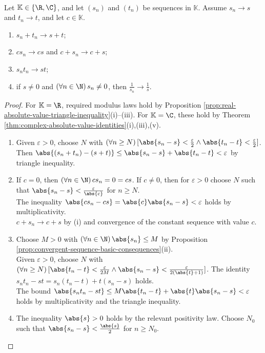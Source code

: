 \begin{theorem} \label{thm:complex-sequence-limit-algebra} \\
Let $\mathbb{K}\in\{\R,\C\}$, and let $(s_n)$ and $(t_n)$ be sequences in $\mathbb{K}$. Assume $s_n\to s$ and $t_n\to t$, and let $c\in\mathbb{K}$.
\begin{enumerate}[label=(\roman*)]
\setlength{\itemsep}{0pt}
\item $s_n+t_n\to s+t$;
\item $cs_n\to cs$ and $c+s_n\to c+s$;
\item $s_nt_n\to st$;
\item if $s\neq0$ and $(\forall n\in\N)\,s_n\neq0$, then $\frac{1}{s_n}\to\frac{1}{s}$.
\end{enumerate}
\begin{proof}
For $\mathbb{K}=\R$, required modulus laws hold by Proposition \ref{prop:real-absolute-value-triangle-inequality}(i)--(iii). For $\mathbb{K}=\C$, these hold by Theorem \ref{thm:complex-absolute-value-identities}(i),(iii),(v).
\begin{enumerate}[label=(\roman*)]
\setlength{\itemsep}{0pt}
\item Given $\varepsilon>0$, choose $N$ with $(\forall n\geq N)\,[\abs{s_n-s}<\frac{\varepsilon}{2}\land\abs{t_n-t}<\frac{\varepsilon}{2}]$.\\
Then $\abs{(s_n+t_n)-(s+t)}\leq\abs{s_n-s}+\abs{t_n-t}<\varepsilon$ by triangle inequality.
\item If $c=0$, then $(\forall n\in\N)\,cs_n=0=cs$. If $c\neq0$, then for $\varepsilon>0$ choose $N$ such that $\abs{s_n-s}<\frac{\varepsilon}{\abs{c}}$ for $n\geq N$.\\
The inequality $\abs{cs_n-cs}=\abs{c}\abs{s_n-s}<\varepsilon$ holds by multiplicativity.\\
$c+s_n\to c+s$ by (i) and convergence of the constant sequence with value $c$.
\item Choose $M>0$ with $(\forall n\in\N)\,\abs{s_n}\leq M$ by Proposition \ref{prop:convergent-sequence-basic-consequences}(ii).\\
Given $\varepsilon>0$, choose $N$ with $(\forall n\geq N)\,[\abs{t_n-t}<\frac{\varepsilon}{2M}\land\abs{s_n-s}<\frac{\varepsilon}{2(\abs{t}+1)}]$. The identity $s_nt_n-st=s_n(t_n-t)+t(s_n-s)$ holds.\\
The bound $\abs{s_nt_n-st}\leq M\abs{t_n-t}+\abs{t}\abs{s_n-s}<\varepsilon$ holds by multiplicativity and the triangle inequality.
\item The inequality $\abs{s}>0$ holds by the relevant positivity law. Choose $N_0$ such that $\abs{s_n-s}<\frac{\abs{s}}{2}$ for $n\geq N_0$.\\

\end{enumerate}
\end{proof}
\end{theorem}

